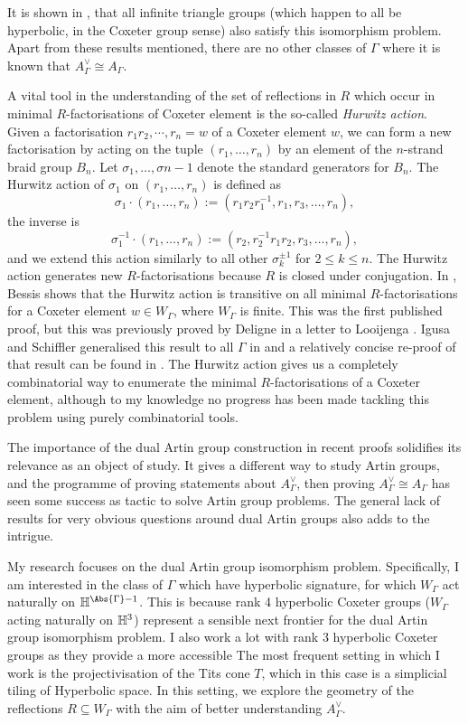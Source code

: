 It is shown in \cite{delucchi_etal_dual_2024}, that all infinite triangle groups (which happen to all be hyperbolic, in the Coxeter group sense) also satisfy this isomorphism problem.
Apart from these results mentioned, there are no other classes of $\Gamma$ where it is known that $A^\vee_\Gamma \cong A_\Gamma$.

A vital tool in the understanding of the set of reflections in $R$ which occur in minimal $R$-factorisations of Coxeter element is the so-called \emph{Hurwitz action}.
Given a factorisation $r_1r_2, \cdots ,r_n=w$ of a Coxeter element $w$, we can form a new factorisation by acting on the tuple  $(r_1, \ldots, r_n)$ by an element of the $n$-strand braid group  $B_n$.
Let  $\sigma_1, \ldots , \sigma{n-1}$ denote the standard generators for $B_n$.
The Hurwitz action of  $\sigma_1$ on  $(r_1, \ldots, r_n)$ is defined as
\[
	\sigma_1 \cdot (r_1, \ldots, r_n) := (r_1r_2r_1^{-1}, r_1, r_3, \ldots, r_n)
	,\]
the inverse is
\[
	\sigma_1^{-1} \cdot (r_1, \ldots, r_n) := (r_2, r_2^{-1}r_1r_2, r_3, \ldots, r_n)
	,\]
and we extend this action similarly to all other $\sigma_k^{\pm 1}$ for  $2\leq k \leq n$.
The Hurwitz action generates new  $R$-factorisations because  $R$ is closed under conjugation.
In \cite{bessis_dual_2003}, Bessis shows that the Hurwitz action is transitive on all minimal  $R$-factorisations for a Coxeter element  $w \in W_\Gamma$, where  $W_\Gamma$ is finite.
This was the first published proof, but this was previously proved by Deligne in a letter to Looijenga \cite{deligne_letter_1974}.
Igusa and Schiffler generalised this result to all $\Gamma$ in \cite{igusa_schiffler_exceptional_2010} and a relatively concise re-proof of that result can be found in \cite{baumeister_etal_note_2014}.
The Hurwitz action gives us a completely combinatorial way to enumerate the minimal $R$-factorisations of a Coxeter element, although to my knowledge no progress has been made tackling this problem using purely combinatorial tools.

The importance of the dual Artin group construction in recent proofs solidifies its relevance as an object of study.
It gives a different way to study Artin groups, and the programme of proving statements about $A^\vee_\Gamma$, then proving  $A^\vee_\Gamma \cong A_\Gamma$ has seen some success as tactic to solve Artin group problems.
The general lack of results for very obvious questions around dual Artin groups also adds to the intrigue.

My research focuses on the dual Artin group isomorphism problem.
Specifically, I am interested in the class of $\Gamma$ which have hyperbolic signature, for which  $W_\Gamma$ act naturally on  $\Hbb^{\Abs{\Gamma}-1}$.
This is because rank 4  hyperbolic Coxeter groups ($W_\Gamma$ acting naturally on $\mathbb{H}^3$) represent a sensible next frontier for the dual Artin group isomorphism problem.
I also work a lot with rank 3 hyperbolic Coxeter groups as they provide a more accessible
The most frequent setting in which I work is the projectivisation of the Tits cone $T$, which in this case is a simplicial tiling of Hyperbolic space.
In this setting, we explore the geometry of the reflections $R \subseteq W_\Gamma$ with the aim of better understanding  $A^\vee_\Gamma$.




